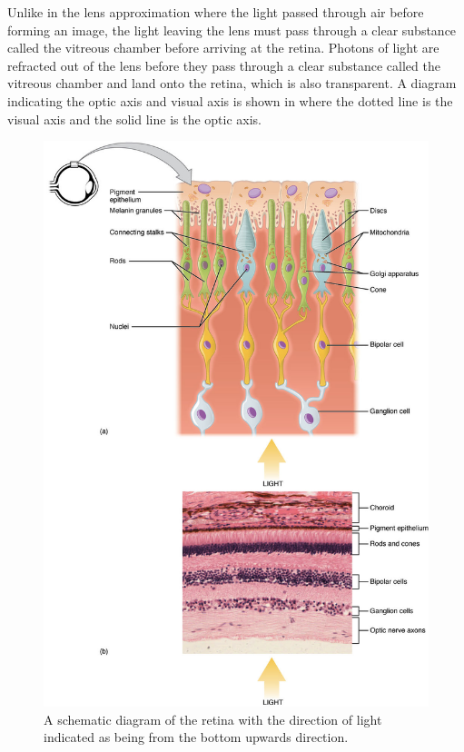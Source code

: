 Unlike in the lens approximation where the light passed through air before forming an
image, the light leaving the lens must pass through a clear substance called the
vitreous chamber before arriving at the retina. Photons of light are refracted out of the
lens before they pass through a clear substance called the vitreous chamber and land
onto the retina, which is also transparent. A diagram indicating the optic axis and
visual axis is shown in  where the dotted line is the visual axis and
the solid line is the optic axis.

\begin{figure}[H]
\centering
  \includegraphics{figures/rods_and_cones}
\caption{A schematic diagram of the retina with the direction of light indicated
as being from the bottom upwards direction.}
\label{fig:retina}
\end{figure}

